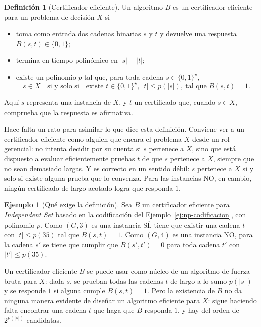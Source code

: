 \documentclass[12pt, spanish, oneside, openany]{book}
\newcommand{\prob}[1]{\textit{#1}}
\newcommand{\IS}{\prob{Independent Set}\xspace}
\theoremstyle{uprightplain}
\theoremstyle{definition}
\newtheorem{definicion}[teorema]{Definición}
\newtheorem{ejemplo}[teorema]{Ejemplo}
\theoremstyle{remark}
\theoremstyle{definition}
\begin{document}
\begin{definicion}[Certificador eficiente]
\label{def:np-certificador}
Un algoritmo $B$ es un certificador eficiente para un problema de decisión $X$ si
\begin{itemize}
    \item toma como entrada dos cadenas binarias $s$ y $t$ y devuelve una respuesta $B(s,t)\in\{0,1\}$;
    \item termina en tiempo polinómico en $|s|+|t|$;
    \item existe un polinomio $p$ tal que, para toda cadena $s\in\{0,1\}^{\star}$,
    \[
    s\in X\quad\text{si y solo si}\quad \text{existe } t\in\{0,1\}^{\star},\ |t|\le p(|s|),\ \text{tal que } B(s,t)=1 .
    \]
\end{itemize}
Aquí $s$ representa una instancia de $X$, y $t$ un certificado que, cuando $s\in X$, comprueba que la respuesta es afirmativa.
\end{definicion}

Hace falta un rato para asimilar lo que dice esta definición. Conviene ver a un certificador eficiente como alguien que encara el problema $X$ desde un rol gerencial: no intenta decidir por su cuenta si $s$ pertenece a $X$, sino que está dispuesto a evaluar eficientemente pruebas $t$ de que $s$ pertenece a $X$, siempre que no sean demasiado largas. Y es correcto en un sentido débil: $s$ pertenece a $X$ si y solo si existe alguna prueba que lo convenza. Para las instancias NO, en cambio, ningún certificado de largo acotado logra que responda $1$.

\begin{ejemplo}[Qué exige la definición]
\label{ej:np-exige}
Sea $B$ un certificador eficiente para \IS basado en la codificación del Ejemplo~\ref{ej:np-codificacion}, con polinomio $p$. Como $(G,3)$ es una instancia SÍ, tiene que existir una cadena $t$ con $|t|\le p(35)$ tal que $B(s,t)=1$. Como $(G,4)$ es una instancia NO, para la cadena $s'$ se tiene que cumplir que $B(s',t')=0$ para toda cadena $t'$ con $|t'|\le p(35)$.
\end{ejemplo}

Un certificador eficiente $B$ se puede usar como núcleo de un algoritmo de fuerza bruta para $X$: dada $s$, se prueban todas las cadenas $t$ de largo a lo sumo $p(|s|)$ y se responde $1$ si alguna cumple $B(s,t)=1$. Pero la existencia de $B$ no da ninguna manera evidente de diseñar un algoritmo eficiente para $X$: sigue haciendo falta encontrar una cadena $t$ que haga que $B$ responda $1$, y hay del orden de $2^{p(|s|)}$ candidatas.
\end{document}
